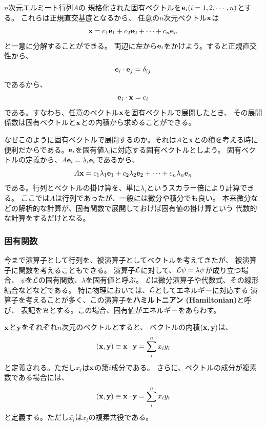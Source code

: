 \documentclass{jarticle}
\begin{document}
$n$次元エルミート行列$A$の
規格化された固有ベクトルを${\bf e}_i (i=1,2,\cdots,n)$とする。
これらは正規直交基底となるから、
任意の$n$次元ベクトル${\bf x}$は
\begin{equation}
  {\bf x} = c_1 {\bf e}_1 + c_2 {\bf e}_2 + \cdots + c_n {\bf e}_n
\end{equation}
と一意に分解することができる。
両辺に左から${\bf e}_i$をかけよう。すると正規直交性から、
\begin{equation}
  {\bf e}_i \cdot {\bf e}_j = \delta_{ij}
\end{equation}
であるから、
\begin{equation}
  {\bf e}_i \cdot {\bf x} = c_i
\end{equation}
である。すなわち、任意のベクトル${\bf x}$を固有ベクトルで展開したとき、
その展開係数は固有ベクトルと${\bf x}$との内積から求めることができる。

なぜこのように固有ベクトルで展開するのか。それは$A$と${\bf x}$との積を考える時に
便利だからである。${\bf e}_i$を固有値$\lambda_i$に対応する固有ベクトルとしよう。
固有ベクトルの定義から、$A{\bf e}_i = \lambda_i {\bf e}_i$であるから、
\begin{equation}
  A {\bf x} = c_1 \lambda_1 {\bf e}_1 + c_2 \lambda_2 {\bf e}_2 + \cdots + c_n \lambda_n {\bf e}_n
\end{equation}
である。行列とベクトルの掛け算を、単に$\lambda_i$というスカラー倍により計算できる。
ここでは$A$は行列であったが、一般には微分や積分でも良い。
本来微分などの解析的な計算が、固有関数で展開しておけば固有値の掛け算という
代数的な計算をするだけとなる。

\subsubsection{固有関数}

今まで演算子として行列を、被演算子としてベクトルを考えてきたが、
被演算子に関数を考えることもできる。
演算子$\cal{L}$に対して、$\cal{L} \psi = \lambda \psi$が成り立つ場合、
$\psi$を$\cal{L}$の固有関数、$\lambda$を固有値と呼ぶ。
$\cal{L}$は微分演算子や代数式、その線形結合などなどである。
特に物理においては、$\cal{L}$としてエネルギーに対応する
演算子を考えることが多く、この演算子を{\bf ハミルトニアン (Hamiltonian)}と呼び、
表記を$\cal H$とする。この場合、固有値がエネルギーをあらわす。


${\bf x}$と${\bf y}$をそれぞれ$n$次元のベクトルとすると、
ベクトルの内積$({\bf x},{\bf y})$は、
\begin{equation}
  ({\bf x},{\bf y}) \equiv {\bf x} \cdot {\bf y} = \sum_i^n x_i y_i
\end{equation}
と定義される。ただし$x_i$は${\bf x}$の第$i$成分である。
さらに、ベクトルの成分が複素数である場合には、
\begin{equation}
  ({\bf x},{\bf y}) \equiv \bar{{\bf x}} \cdot {\bf y} = \sum_i^n \bar{x_i} y_i
\end{equation}
と定義する。ただし$\bar{x_i}$は$x_i$の複素共役である。
\end{document}
